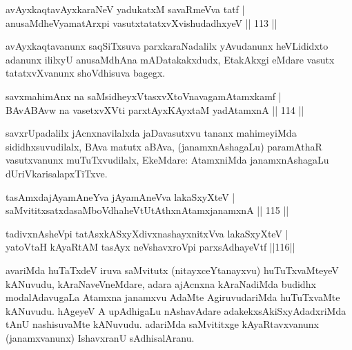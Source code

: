 \begin{shl}
avAyxkaqtavAyxkaraNeV yadukatxM savaRmeVva tatf |\\
anusaMdheVyamatArxpi vasutxtatatxvXvishudadhxyeV \hfill || 113 ||
\end{shl}

\begin{artha}
avAyxkaqtavanunx saqSiTxsuva parxkaraNadalilx yAvudanunx heVLididxto adanunx ililxyU anusaMdhAna mADatakakxdudx, EtakAkxgi eMdare vasutx tatatxvXvanunx shoVdhisuva bagegx.
\end{artha}


\begin{shl}
savxmahimAnx na saMsidheyxVtasxvXtoV\s navagamAtamxkamf |\\
BAvABAvw na vasetxvXVti parxtAyxKAyxtaM yadAtamxnA \hfill || 114 ||
\end{shl}

\begin{artha}%
savxrUpadalilx jAcnxnavilalxda jaDavasutxvu tananx mahimeyiMda sididhxsuvudilalx, BAva matutx aBAva, (janamxnAshagaLu) paramAthaR vasutxvanunx muTuTxvudilalx, EkeMdare: AtamxniMda janamxnAshagaLu dUriVkarisalapxTiTxve.
\end{artha}


\begin{shl}
tasAmxdajAyamAneYva jAyamAneVva lakaSxyXteV |\\
saMvititxsatxdasaMboVdhaheVtUtAthxnAtamxjanamxnA \hfill || 115 ||
\end{shl}

\begin{shl}
tadivxnAsheV\s pi tatAsxkASxyXdivxnashayxnitxVva lakaSxyXteV |\\
yatoV\s taH kAyaRtAM tasAyx neVshavxroV\s pi parxsAdhayeVtf \hfill ||116||
\end{shl}

\begin{artha}
avariMda huTaTxdeV iruva saMvitutx (nitayxceYtanayxvu) huTuTxvaMteyeV kANuvudu, kAraNaveVneMdare, adara ajAcnxna kAraNadiMda budidhx modalAdavugaLa Atamxna janamxvu AdaMte AgiruvudariMda huTuTxvaMte kANuvudu. hAgeyeV A upAdhigaLu nAshavAdare adakekx\break sAkiSxyAdadxriMda tAnU nashisuvaMte kANuvudu. adariMda saMvititxge kAyaRtavxvanunx (janamxvanunx) IshavxranU sAdhisalAranu.
\end{artha}


